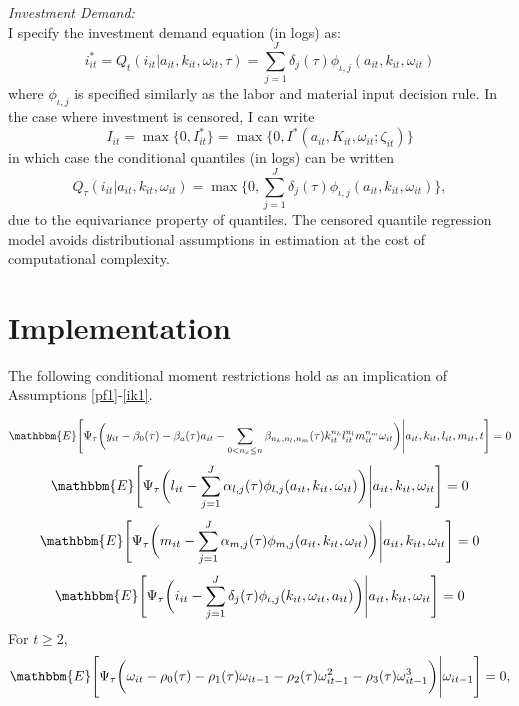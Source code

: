 \documentclass{article}
\begin{document}
\noindent \textit{Investment Demand:}\\
I specify the investment demand equation (in logs) as:
\begin{equation}\label{imodel}
i^{*}_{it}=Q_{t}(i_{it}|a_{it}, k_{it}, \omega_{it}, \tau)=\sum_{j=1}^{J}\delta_{j}(\tau)\phi_{\iota,j}(a_{it}, k_{it}, \omega_{it})
\end{equation}
where $\phi_{\iota,j}$ is specified similarly as the labor and material input decision rule. In the case where investment is censored, I can write
\begin{equation}
I_{it}=\max\{0, I^{*}_{it}\}=\max\{0, I^{*}(a_{it}, K_{it}, \omega_{it}; \zeta_{it})\}
\end{equation}
in which case the conditional quantiles (in logs) can be written
\begin{equation}
Q_{\tau}(i_{it}|a_{it}, k_{it}, \omega_{it})=\max\{0, \sum_{j=1}^{J}\delta_{j}(\tau)\phi_{\iota,j}(a_{it}, k_{it}, \omega_{it})\},
\end{equation}
due to the equivariance property of quantiles. The censored quantile regression model avoids distributional assumptions in estimation at the cost of computational complexity.

\section{Implementation} \label{implementation}
The following conditional moment restrictions hold as an implication of Assumptions \ref{pf1}-\ref{ik1}.

\begin{equation}\label{ymoment}
\mathbbm{E}\Bigg[\Psi_{\tau}\bigg(y_{it}-\beta_{0}(\tau)-\beta_{a}(\tau)a_{it}-\sum_{0<n_{x}\leq n}\beta_{n_{k}, n_{l}, n_{m}}(\tau)k_{it}^{n_{k}}l^{n_{l}}_{it}m^{n_{m}}_{it}\omega_{it}\bigg)\Bigg|a_{it}, k_{it}, l_{it}, m_{it}, t\Bigg]=0
\end{equation}
\begin{equation}\label{lmoment}
\mathbbm{E}\Bigg[\Psi_{\tau}\bigg(l_{it}-\sum_{j=1}^{J}\alpha_{l,j}(\tau)\phi_{l,j}(a_{it}, k_{it}, \omega_{it})\bigg)\Bigg|a_{it}, k_{it}, \omega_{it}\Bigg]=0
\end{equation}
\begin{equation}\label{mmoment}
\mathbbm{E}\Bigg[\Psi_{\tau}\bigg(m_{it}-\sum_{j=1}^{J}\alpha_{m,j}(\tau)\phi_{m,j}(a_{it}, k_{it}, \omega_{it})\bigg)\Bigg|a_{it}, k_{it}, \omega_{it}\Bigg]=0
\end{equation}
\begin{equation}\label{imoment}
\mathbbm{E}\Bigg[\Psi_{\tau}\bigg(i_{it}-\sum_{j=1}^{J}\delta_{j}(\tau)\phi_{\iota,j}(k_{it}, \omega_{it}, a_{it})\bigg)\Bigg|a_{it}, k_{it}, \omega_{it}\Bigg]=0
\end{equation}
For $t\geq 2$,
\begin{equation}\label{omegamoment}
\mathbbm{E}\Bigg[\Psi_{\tau}\bigg(\omega_{it}-\rho_{0}(\tau)-\rho_{1}(\tau)\omega_{it-1}-\rho_{2}(\tau)\omega^{2}_{it-1}-\rho_{3}(\tau)\omega^{3}_{it-1}\bigg)\Bigg|\omega_{it-1}\Bigg]=0,
\end{equation}
\end{document}

